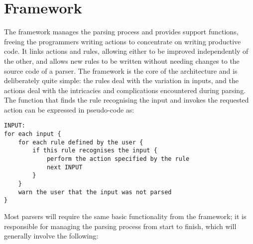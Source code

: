 \section{Framework}

\label{framework in architecture}

The framework manages the parsing process and provides support functions,
freeing the programmers writing actions to concentrate on writing
productive code.  It links actions and rules, allowing either to be
improved independently of the other, and allows new rules to be written
without needing changes to the source code of a parser.  The framework is
the core of the architecture and is deliberately quite simple: the rules
deal with the variation in inputs, and the actions deal with the
intricacies and complications encountered during parsing.  The function
that finds the rule recognising the input and invokes the requested action
can be expressed in pseudo-code as:

\begin{verbatim}
INPUT:
for each input {
    for each rule defined by the user {
        if this rule recognises the input {
            perform the action specified by the rule
            next INPUT
        }
    }
    warn the user that the input was not parsed
}
\end{verbatim}

Most parsers will require the same basic functionality from the framework;
it is responsible for managing the parsing process from start to finish,
which will generally involve the following:


